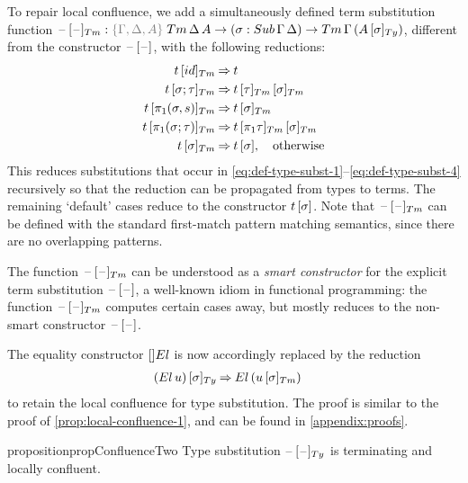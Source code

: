 \documentclass[a4paper,UKenglish,numberwithinsect,cleveref,thm-restate]{lipics-v2021}
\newcommand{\danger}{\marginpar[\hfill\dbend]{\dbend\hfill}}
\begin{document}
To repair local confluence, we add a simultaneously defined term substitution function $\subTm{\blank}{\blank} : \implicit{\Gamma, \Delta, A}\;\Tm\,\Delta\,A \to (\sigma : \Sub\,\Gamma\,\Delta) \to \Tm\,\Gamma\,(\subTy{A}{\sigma})$, different from the constructor ${\mathord{\hspace{1pt}\text{--}\hspace{1pt}}}\,[\mathord{\hspace{1pt}\text{--}\hspace{1pt}}]$, with the following reductions:
\begin{alignat*}{3}
\subTm{t}{\idS}          & \reduce t \\
\subTm{t}{\sigma ; \tau} & \reduce \subTm{\subTm{t}{\tau}}{\sigma} \\
\subTm{t}{\pi_1(\sigma, s)} & \reduce \subTm{t}{\sigma} \\
\subTm{t}{\pi_1(\sigma; \tau)} & \reduce \subTm{\subTm{t}{\pi_1\tau}}{\sigma} \\
\subTm{t}{\sigma}        & \reduce \sub{t}{\sigma}, \quad \text{otherwise}
\end{alignat*}
This reduces substitutions that occur in \eqref{eq:def-type-subst-1}--\eqref{eq:def-type-subst-4} recursively so that the reduction can be propagated from types to terms.
The remaining `default' cases reduce to the constructor ${t}\,[\sigma]$.
Note that $\subTm{\blank}{\blank}$ can be defined with the standard first-match pattern matching semantics, since there are no overlapping patterns.
\begin{remark}
  The function $\subTm{\blank}{\blank}$ can be understood as a \emph{smart constructor} for the explicit term substitution ${\mathord{\hspace{1pt}\text{--}\hspace{1pt}}}\,[\mathord{\hspace{1pt}\text{--}\hspace{1pt}}]$, a well-known idiom in functional programming: the function $\subTm{\blank}{\blank}$ computes certain cases away, but mostly reduces to the non-smart constructor ${\mathord{\hspace{1pt}\text{--}\hspace{1pt}}}\,[\mathord{\hspace{1pt}\text{--}\hspace{1pt}}]$.
\end{remark}

The equality constructor $[]\El$ is now accordingly replaced by the reduction
\begin{align}
  \subTy{(\El\, u)}{\sigma} & \reduce \El\,(\subTm{u}{\sigma}) \label{eq:def-type-subst-7}
\end{align}
to retain the local confluence for type substitution. The proof is similar to the proof of \cref{prop:local-confluence-1}, and can be found in \cref{appendix:proofs}.
\begin{restatable}{proposition}{propConfluenceTwo}\label{prop:local-confluence-2}
  \danger
  Type substitution $\subTy{\blank}{\blank}$ is terminating and locally confluent.
\end{restatable}
\end{document}
